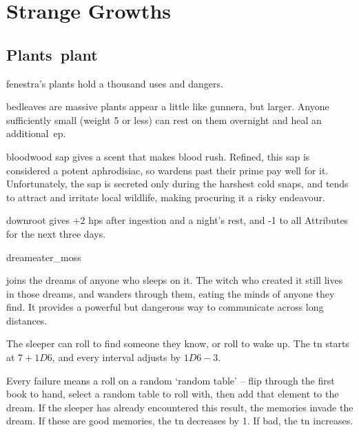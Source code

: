 \chapter{Strange Growths}
\label{growths}

\section[Plants]{Plants~\gls{plant}}
\label{plants}

\begin{multicols}{2}
\renewcommand\npcsymbol{\glsentrytext{plant}}

\noindent
\Gls{fenestra}'s plants hold a thousand uses and dangers.

%
  {bedleaves}%
  {are massive plants appear a little like gunnera, but larger.
  Anyone sufficiently small (\gls{weight} 5 or less) can rest on them overnight and heal an additional~\gls{ep}.}%

%
  {bloodwood}%
  {sap gives a scent that makes blood rush.
  Refined, this sap is considered a potent aphrodisiac, so \glspl{warden} past their prime pay well for it.
  Unfortunately, the sap is secreted only during the harshest cold snaps, 
  and tends to attract and irritate local wildlife, making procuring it a risky endeavour.
  }

%
  {downroot}%
  {gives +2 \glspl{hp} after ingestion and a night's rest, and -1 to all Attributes for the next three days.
  }

%
  {dreameater_moss}%
  {joins the dreams of anyone who sleeps on it.
    The \gls{witch} who created it still lives in those dreams, and wanders through them, eating the minds of anyone they find.
    It provides a powerful but dangerous way to communicate across long distances.

    The sleeper can roll  to find someone they know, or roll  to wake up.
    The \gls{tn} starts at $7 + 1D6$, and every \gls{interval} adjusts by $1D6 - 3$.

    Every failure means a roll on a random `random table' -- flip through the first book to hand, select a random table to roll with, then add that element to the dream.
    If the sleeper has already encountered this result, the memories invade the dream.
    If these are good memories, the \gls{tn} decreases by 1.
    If bad, the \gls{tn} increases.
  }


\end{multicols}
